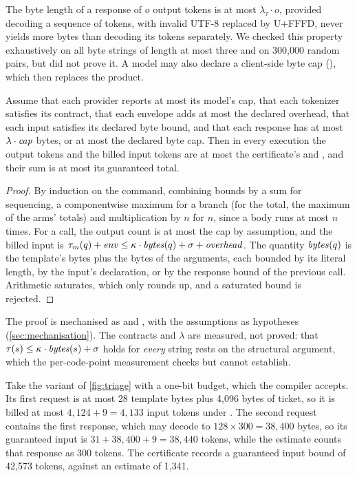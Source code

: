 The byte length of a response of $o$ output tokens is at most $\lambda_\tau \cdot o$,
provided decoding a sequence of tokens, with invalid UTF-8 replaced by U+FFFD, never
yields more bytes than decoding its tokens separately. We checked this property
exhaustively on all byte strings of length at most three and on 300,000 random
pairs, but did not prove it. A model may also declare a client-side byte cap
(), which then replaces the product.

\begin{theorem}\label{thm:bound}
Assume that each provider reports at most its model's cap, that each tokenizer
satisfies its contract, that each envelope adds at most the declared overhead, that
each input satisfies its declared byte bound, and that each response has at most
$\lambda \cdot \mathit{cap}$ bytes, or at most the declared byte cap. Then in every execution
the output tokens and the billed input tokens are at most the certificate's
 and , and their sum is at most
its guaranteed total.
\end{theorem}

\begin{proof}
By induction on the command, combining bounds by a sum for sequencing, a
componentwise maximum for a branch (for the total, the maximum of the arms'
totals) and multiplication by $n$ for  $n$, since a body runs at most
$n$ times. For a call, the output count is at most the cap by assumption, and the
billed input is $\tau_m(q) + \mathit{env} \leq \kappa \cdot \mathit{bytes}(q) + \sigma +
\mathit{overhead}$. The quantity $\mathit{bytes}(q)$ is the template's bytes plus the bytes of
the arguments, each bounded by its literal length, by the input's declaration, or by
the response bound of the previous call. Arithmetic saturates, which only rounds
up, and a saturated bound is rejected.
\end{proof}

The proof is mechanised as  and , with the
assumptions as hypotheses (\cref{sec:mechanisation}). The contracts and $\lambda$ are
measured, not proved: that $\tau(s) \leq \kappa \cdot \mathit{bytes}(s) + \sigma$ holds for
\emph{every} string rests on the structural argument, which the per-code-point
measurement checks but cannot establish.

\begin{example}\label{ex:triage-bound}
Take the variant of \cref{fig:triage} with a one-bit budget, which the compiler
accepts. Its first request is at most 28 template bytes plus 4,096 bytes of ticket, so it is billed at most $4{,}124 + 9 = 4{,}133$ input tokens under
. The second request contains the first response, which may decode to
$128 \times 300 = 38{,}400$ bytes, so its guaranteed input is $31 + 38{,}400 + 9 =
38{,}440$ tokens, while the estimate counts that response as 300 tokens. The
certificate records a guaranteed input bound of 42,573 tokens, against an estimate of
1,341.
\end{example}

